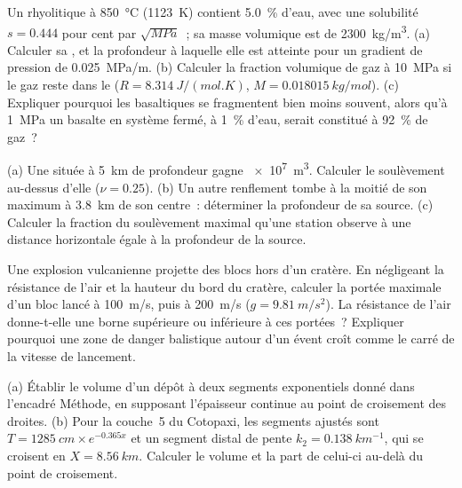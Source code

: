 \begin{exercise}[$\star\star$]\label{exo:b2:eruptive-styles:7}
Un  rhyolitique à \qty{850}{\celsius} (\qty{1123}{K}) contient
\qty{5.0}{\percent} d'eau, avec une solubilité $s = 0.444$ pour cent par
$\sqrt{\unit{MPa}}$~; sa masse volumique est de \qty{2300}{kg/m^3}. (a) Calculer sa
, et la profondeur à laquelle elle est atteinte pour un
gradient de pression de \qty{0.025}{MPa/m}. (b) Calculer la fraction volumique de gaz à
\qty{10}{MPa} si le gaz reste dans le  ($R = \qty{8.314}{J/(mol.K)}$, $M =
\qty{0.018015}{kg/mol}$). (c) Expliquer pourquoi les  basaltiques se fragmentent bien moins
souvent, alors qu'à \qty{1}{MPa} un basalte en système fermé, à \qty{1}{\percent} d'eau, serait
constitué à \qty{92}{\percent} de gaz~?
\end{exercise}

\begin{exercise}[$\star\star$]\label{exo:b2:eruptive-styles:8}
(a) Une  située à \qty{5}{km} de profondeur gagne \qty{e7}{m^3}. Calculer le
soulèvement au-dessus d'elle ($\nu = 0.25$). (b) Un autre renflement tombe à la moitié de son maximum à
\qty{3.8}{km} de son centre~: déterminer la profondeur de sa source. (c) Calculer la fraction du
soulèvement maximal qu'une station observe à une distance horizontale égale à la profondeur
de la source.
\end{exercise}

\begin{exercise}[$\star\star$]\label{exo:b2:eruptive-styles:9}
Une explosion vulcanienne projette des blocs hors d'un cratère. En négligeant la résistance de l'air
et la hauteur du bord du cratère, calculer la portée maximale d'un bloc lancé à \qty{100}{m/s},
puis à \qty{200}{m/s} ($g = \qty{9.81}{m/s^2}$). La résistance de l'air donne-t-elle une borne
supérieure ou inférieure à ces portées~? Expliquer pourquoi une zone de danger balistique
autour d'un évent croît comme le carré de la vitesse de lancement.
\end{exercise}

\begin{exercise}[$\star\star\star$]\label{exo:b2:eruptive-styles:10}
(a) Établir le volume d'un dépôt à deux segments exponentiels donné dans l'encadré Méthode,
en supposant l'épaisseur continue au point de croisement des droites. (b) Pour
la couche~5 du Cotopaxi, les segments ajustés sont $T = \qty{1285}{cm}\times
e^{-0.365x}$ et un segment distal de pente $k_2 = \qty{0.138}{km^{-1}}$, qui se croisent en
$X = \qty{8.56}{km}$. Calculer le volume et la part de celui-ci au-delà du
point de croisement.
\end{exercise}

